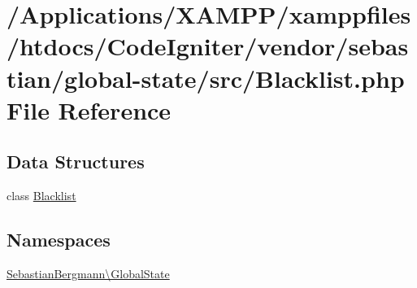 \hypertarget{sebastian_2global-state_2src_2_blacklist_8php}{}\section{/\+Applications/\+X\+A\+M\+P\+P/xamppfiles/htdocs/\+Code\+Igniter/vendor/sebastian/global-\/state/src/\+Blacklist.php File Reference}
\label{sebastian_2global-state_2src_2_blacklist_8php}
\subsection*{Data Structures}
\begin{DoxyCompactItemize}
\item 
class \mbox{\hyperlink{class_sebastian_bergmann_1_1_global_state_1_1_blacklist}{Blacklist}}
\end{DoxyCompactItemize}
\subsection*{Namespaces}
\begin{DoxyCompactItemize}
\item 
 \mbox{\hyperlink{namespace_sebastian_bergmann_1_1_global_state}{Sebastian\+Bergmann\textbackslash{}\+Global\+State}}
\end{DoxyCompactItemize}
